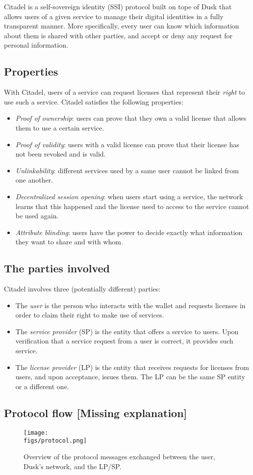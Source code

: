 
Citadel is a self-sovereign identity (SSI) protocol built on tope of Dusk that allows users of a given service to manage their digital identities in a fully transparent manner. More specifically, every user can know which information about them is shared with other parties, and accept or deny any request for personal information.

\subsection{Properties}

With Citadel, users of a service can request licenses that represent their \emph{right} to use such a service. Citadel satisfies the following properties:

\begin{itemize}
	\item \emph{Proof of ownership}: users can prove that they own a valid license that allows them to use a certain service.
	\item \emph{Proof of validity}: users with a valid license can prove that their license has not been revoked and is valid.
	\item \emph{Unlinkability}: different services used by a same user cannot be linked from one another.
	\item \emph{Decentralized session opening}: when users start using a service, the network learns that this happened and the license used to access to the service cannot be used again.
	\item \emph{Attribute blinding}: users have the power to decide exactly what information they want to share and with whom.
\end{itemize}

\subsection{The parties involved}

Citadel involves three (potentially different) parties:

\begin{itemize}
    \item The \emph{user} is the person who interacts with the wallet and requests licenses in order to claim their right to make use of services.
    \item The \emph{service provider} (SP) is the entity that offers a service to users. Upon verification that a service request from a user is correct, it provides such service.
    \item The \emph{license provider} (LP) is the entity that receives requests for licenses from users, and upon acceptance, issues them. The LP can be the same SP entity or a different one.
\end{itemize}

\subsection{Protocol flow \color{red}[Missing explanation]}

\begin{figure}[h]
	\centering
	\texttt{[image: \\figs/protocol.png]}
	\caption{Overview of the protocol messages exchanged between the user, Dusk's network, and the LP/SP.}
	\label{fig:protocol}
\end{figure}

